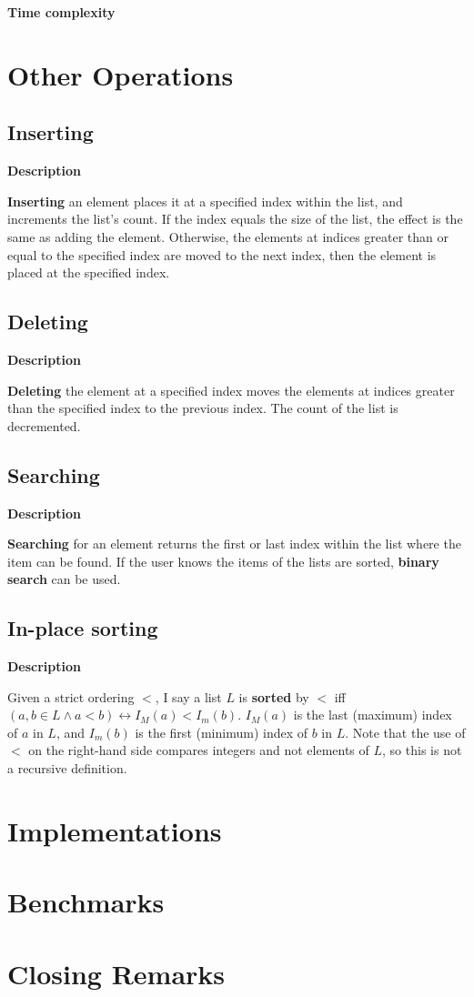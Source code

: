 \documentclass{article}
\newcommand{\descriptn}{\textbf{Description}}
\newcommand{\tcomplex}{\textbf{Time complexity}}
\newcommand{\listname}{L}
\begin{document}
	\tcomplex
	
	\section{Other Operations}
	
	\subsection{Inserting}
	
	\descriptn
	
	\textbf{Inserting} an element places it at a specified index within the list, and increments the list's count. If the index equals the size of the list, the effect is the same as adding the element. Otherwise, the elements at indices greater than or equal to the specified index are moved to the next index, then the element is placed at the specified index.
	
	\subsection{Deleting}
	
	\descriptn
	
	\textbf{Deleting} the element at a specified index moves the elements at indices greater than the specified index to the previous index. The count of the list is decremented.
	
	\subsection{Searching}
	
	\descriptn
	
	\textbf{Searching} for an element returns the first or last index within the list where the item can be found. If the user knows the items of the lists are sorted, \textbf{binary search} can be used.
	
	\subsection{In-place sorting}
	
	\descriptn
	
	Given a strict ordering $<$, I say a list $\listname$ is \textbf{sorted} by $<$ iff $\left(a, b \in \listname \land a < b\right) \leftrightarrow I_M(a) < I_m(b)$. $I_M(a)$ is the last (maximum) index of $a$ in $L$, and $I_m(b)$ is the first (minimum) index of $b$ in $L$. Note that the use of $<$ on the right-hand side compares integers and not elements of $L$, so this is not a recursive definition.
	
	\section{Implementations}
	
	\section{Benchmarks}
	
	\section{Closing Remarks}
\end{document}
